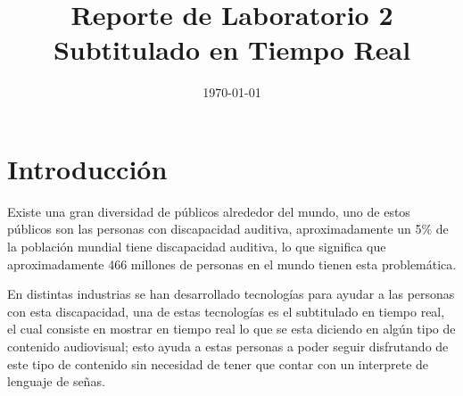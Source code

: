 \documentclass[conference]{IEEEtran}
\date{\specialdate\today}
\begin{document}
\newcommand{\breite}{0.9} %
\newcommand{\RelacionFiguradoscolumnas}{0.9}
\newcommand{\RelacionFiguradoscolumnasPuntoCinco}{0.45}

\title{Reporte de Laboratorio 2 \\ Subtitulado en Tiempo Real}

\author{
}

\maketitle

\begin{abstract} 

\end{abstract}

\section{Introducción}
Existe una gran diversidad de públicos alrededor del mundo, uno de estos públicos son las personas con discapacidad auditiva, aproximadamente un 5\% de la población mundial tiene discapacidad auditiva, lo que significa que aproximadamente 466 millones de personas en el mundo tienen esta problemática. \cite{OMS}

En distintas industrias se han desarrollado tecnologías para ayudar a las personas con esta discapacidad, una de estas tecnologías es el subtitulado en tiempo real, el cual consiste en mostrar en tiempo real lo que se esta diciendo en algún tipo de contenido audiovisual; esto ayuda a estas personas a poder seguir disfrutando de este tipo de contenido sin necesidad de tener que contar con un interprete de lenguaje de señas.

\end{document}
